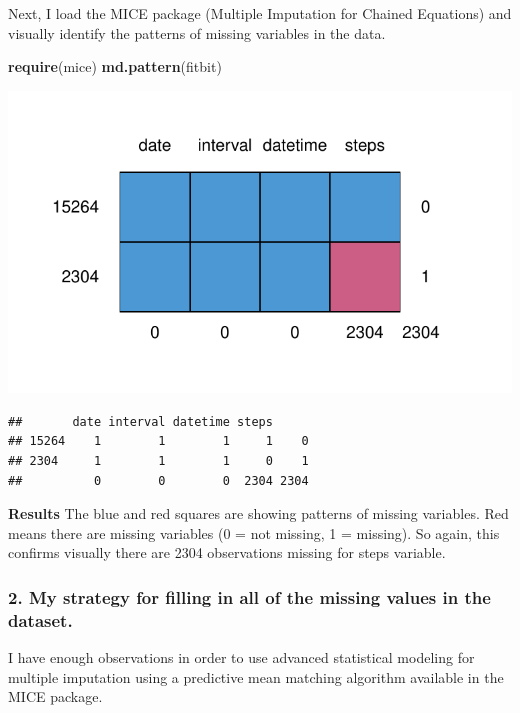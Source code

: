 \documentclass[]{article}
\newenvironment{Shaded}{\begin{snugshade}}{\end{snugshade}}
\newcommand{\KeywordTok}[1]{\textcolor[rgb]{0.13,0.29,0.53}{\textbf{#1}}}
\newcommand{\NormalTok}[1]{#1}
\begin{document}
Next, I load the MICE package (Multiple Imputation for Chained
Equations) and visually identify the patterns of missing variables in
the data.

\begin{Shaded}
\begin{Highlighting}[]
\KeywordTok{require}\NormalTok{(mice)}
\KeywordTok{md.pattern}\NormalTok{(fitbit)}
\end{Highlighting}
\end{Shaded}

\includegraphics{PA1_template_files/figure-latex/librarymicepatterns-1.pdf}

\begin{verbatim}
##       date interval datetime steps     
## 15264    1        1        1     1    0
## 2304     1        1        1     0    1
##          0        0        0  2304 2304
\end{verbatim}

\textbf{Results} The blue and red squares are showing patterns of
missing variables. Red means there are missing variables (0 = not
missing, 1 = missing). So again, this confirms visually there are 2304
observations missing for steps variable.

\subsubsection{2. My strategy for filling in all of the missing values
in the
dataset.}\label{my-strategy-for-filling-in-all-of-the-missing-values-in-the-dataset.}

I have enough observations in order to use advanced statistical modeling
for multiple imputation using a predictive mean matching algorithm
available in the MICE package.
\end{document}
